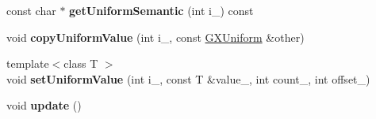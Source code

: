 \begin{DoxyCompactItemize}
\item 
const char $\ast$ {\bfseries get\+Uniform\+Semantic} (int i\+\_\+) const \hypertarget{class_magnum_1_1_g_x_shader_program_a556be1ab7deaab781c9b0050255cfce1}{}\label{class_magnum_1_1_g_x_shader_program_a556be1ab7deaab781c9b0050255cfce1}

\item 
void {\bfseries copy\+Uniform\+Value} (int i\+\_\+, const \hyperlink{class_magnum_1_1_g_x_uniform}{G\+X\+Uniform} \&other)\hypertarget{class_magnum_1_1_g_x_shader_program_a5a091c98c4803ab0379fc559352f33ab}{}\label{class_magnum_1_1_g_x_shader_program_a5a091c98c4803ab0379fc559352f33ab}

\item 
{\footnotesize template$<$class T $>$ }\\void {\bfseries set\+Uniform\+Value} (int i\+\_\+, const T \&value\+\_\+, int count\+\_, int offset\+\_)\hypertarget{class_magnum_1_1_g_x_shader_program_a64288e06c6eae510897efebd8643fc36}{}\label{class_magnum_1_1_g_x_shader_program_a64288e06c6eae510897efebd8643fc36}

\item 
void {\bfseries update} ()\hypertarget{class_magnum_1_1_g_x_shader_program_a971588492c3a1afb99e3844def5d7d24}{}\label{class_magnum_1_1_g_x_shader_program_a971588492c3a1afb99e3844def5d7d24}

\end{DoxyCompactItemize}

